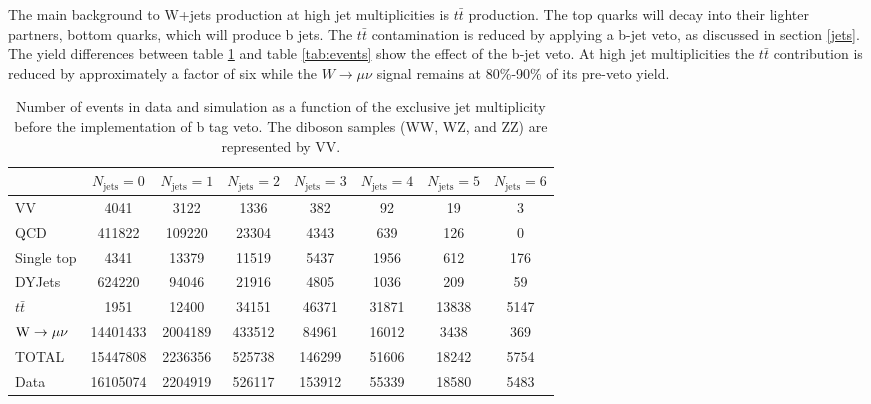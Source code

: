 \documentclass[oneside, letterpaper, oldfontcommands]{memoir}
\begin{document}
\qquad The main background to W+jets production at high jet multiplicities is $t\bar{t}$ production. The top quarks will decay into their lighter partners, bottom quarks, which will produce b jets. The $t\bar{t}$ contamination is reduced by applying a b-jet veto, as discussed in section \ref{jets}. The yield differences between table \ref{tab:btag} and table \ref{tab:events} show the effect of the b-jet veto. At high jet multiplicities the $t\bar{t}$ contribution is reduced by approximately a factor of six while the $W \rightarrow \mu\nu$ signal remains at 80\%-90\% of its pre-veto yield.

\begin{table}\small
\centering
\caption{Number of events in data and simulation as a function of the exclusive jet multiplicity before the implementation of b tag veto. The diboson samples (WW, WZ, and ZZ) are represented by VV.}
\footnotesize{
\begin{tabular}{l|ccccccc}
  &  $N_{\text{jets}} = 0 $ & $N_{\text{jets}} = 1 $ & $N_{\text{jets}} = 2 $ & $N_{\text{jets}} = 3 $ & $N_{\text{jets}} = 4 $ & $N_{\text{jets}} = 5 $ & $N_{\text{jets}} = 6 $ \\ \hline
   VV        & 4041 & 3122 & 1336 & 382 & 92 & 19 & 3  \\
   QCD        & 411822 & 109220 & 23304 & 4343 & 639 & 126 & 0  \\
   Single top        & 4341 & 13379 & 11519 & 5437 & 1956 & 612 & 176 \\
   DYJets        & 624220 & 94046 & 21916 & 4805 & 1036 & 209 & 59 \\
   $t\bar{t}$        & 1951 & 12400 & 34151 & 46371 & 31871 & 13838 & 5147 \\
   $\mathrm{W} \rightarrow \mu\nu$        & 14401433 & 2004189 & 433512 & 84961 & 16012 & 3438 & 369 \\
 \hline
 TOTAL & 15447808 & 2236356 & 525738 & 146299 & 51606 & 18242 & 5754 \\
 \hline
 Data          & 16105074 & 2204919 & 526117 & 153912 & 55339 & 18580 & 5483 \\
 \end{tabular}}
\label{tab:btag}
\end{table}
\end{document}
